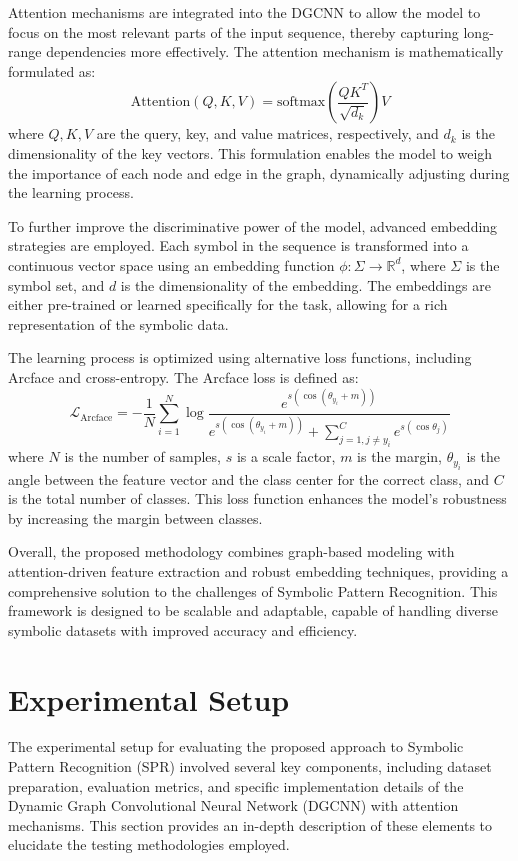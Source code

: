 \documentclass{article}
\begin{document}
Attention mechanisms are integrated into the DGCNN to allow the model to focus on the most relevant parts of the input sequence, thereby capturing long-range dependencies more effectively. The attention mechanism is mathematically formulated as:
\[
\text{Attention}(Q, K, V) = \text{softmax}\left(\frac{QK^T}{\sqrt{d_k}}\right)V
\]
where \( Q, K, V \) are the query, key, and value matrices, respectively, and \( d_k \) is the dimensionality of the key vectors. This formulation enables the model to weigh the importance of each node and edge in the graph, dynamically adjusting during the learning process.

To further improve the discriminative power of the model, advanced embedding strategies are employed. Each symbol in the sequence is transformed into a continuous vector space using an embedding function \( \phi: \Sigma \rightarrow \mathbb{R}^d \), where \( \Sigma \) is the symbol set, and \( d \) is the dimensionality of the embedding. The embeddings are either pre-trained or learned specifically for the task, allowing for a rich representation of the symbolic data.

The learning process is optimized using alternative loss functions, including Arcface and cross-entropy. The Arcface loss is defined as:
\[
\mathcal{L}_{\text{Arcface}} = -\frac{1}{N}\sum_{i=1}^N \log \frac{e^{s (\cos(\theta_{y_i} + m))}}{e^{s (\cos(\theta_{y_i} + m))} + \sum_{j=1, j \neq y_i}^C e^{s (\cos \theta_j)}}
\]
where \( N \) is the number of samples, \( s \) is a scale factor, \( m \) is the margin, \( \theta_{y_i} \) is the angle between the feature vector and the class center for the correct class, and \( C \) is the total number of classes. This loss function enhances the model's robustness by increasing the margin between classes.

Overall, the proposed methodology combines graph-based modeling with attention-driven feature extraction and robust embedding techniques, providing a comprehensive solution to the challenges of Symbolic Pattern Recognition. This framework is designed to be scalable and adaptable, capable of handling diverse symbolic datasets with improved accuracy and efficiency.

\section{Experimental Setup}
The experimental setup for evaluating the proposed approach to Symbolic Pattern Recognition (SPR) involved several key components, including dataset preparation, evaluation metrics, and specific implementation details of the Dynamic Graph Convolutional Neural Network (DGCNN) with attention mechanisms. This section provides an in-depth description of these elements to elucidate the testing methodologies employed.
\end{document}
